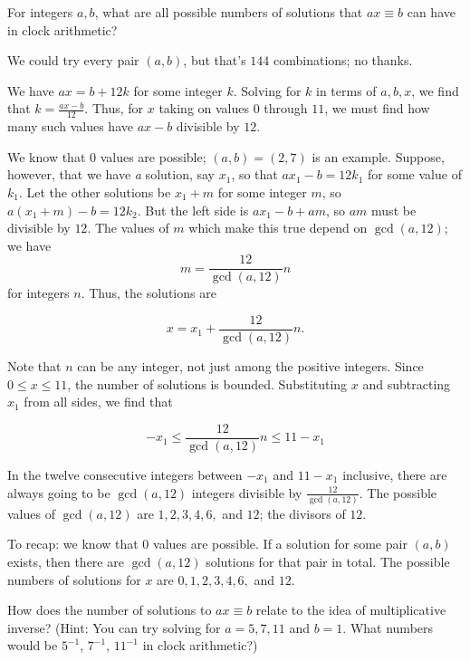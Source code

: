 \documentclass[../gatm_answers.tex]{subfiles}
\begin{document}
\begin{inner_problem}
\item For integers $a,b$, what are all possible numbers of solutions that $ax\equiv b$ can have in clock arithmetic?
\end{inner_problem}

We could try every pair $(a,b)$, but that's $144$ combinations; no thanks.

We have $ax=b+12k$ for some integer $k$. Solving for $k$ in terms of $a,b,x$, we find that $k=\frac{ax-b}{12}$. Thus, for $x$ taking on values $0$ through $11$, we must find how many such values have $ax-b$ divisible by $12$.

We know that $0$ values are possible; $(a,b)=(2,7)$ is an example. Suppose, however, that we have \textit{a} solution, say $x_1$, so that $ax_1-b=12k_1$ for some value of $k_1$. Let the other solutions be $x_1+m$ for some integer $m$, so $a(x_1+m)-b=12k_2$. But the left side is $ax_1-b+am$, so $am$ must be divisible by $12$. The values of $m$ which make this true depend on $\gcd (a,12)$; we have $$m=\frac{12}{\gcd(a,12)}n$$ for integers $n$. Thus, the solutions are

$$x=x_1+\frac{12}{\gcd(a,12)}n.$$

Note that $n$ can be any integer, not just among the positive integers. Since $0\leq x \leq 11$, the number of solutions is bounded. Substituting $x$ and subtracting $x_1$ from all sides, we find that

$$-x_1\leq \frac{12}{\gcd(a,12)}n\leq 11-x_1$$

In the twelve consecutive integers between $-x_1$ and $11-x_1$ inclusive, there are always going to be $\gcd (a,12)$ integers divisible by $\frac{12}{\gcd(a,12)}$. The possible values of $\gcd (a,12)$ are $1,2,3,4,6,$ and $12$; the divisors of $12$.

To recap: we know that $0$ values are possible. If a solution for some pair $(a,b)$ exists, then there are $\gcd(a,12)$ solutions for that pair in total. The possible numbers of solutions for $x$ are $0,1,2,3,4,6,$ and $12$.

\begin{outer_problem}
\item How does the number of solutions to $ax\equiv b$ relate to the idea of multiplicative inverse? (Hint: You can try solving for $a=5,7,11$ and $b=1$. What numbers would be $5^{-1}$, $7^{-1}$, $11^{-1}$ in clock arithmetic?)
\end{outer_problem}
\end{document}
